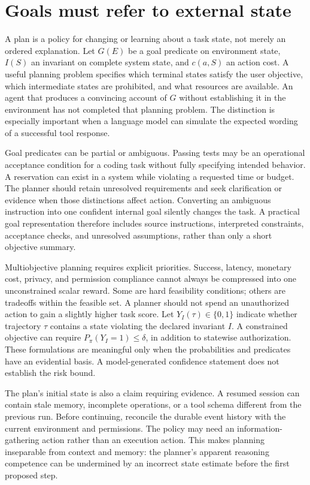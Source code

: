 \section{Goals must refer to external state}
\label{sec:C10:goals}
A plan is a policy for changing or learning about a task state, not merely an ordered explanation. Let $G(E)$ be a goal predicate on environment state, $I(S)$ an invariant on complete system state, and $c(a,S)$ an action cost. A useful planning problem specifies which terminal states satisfy the user objective, which intermediate states are prohibited, and what resources are available. An agent that produces a convincing account of $G$ without establishing it in the environment has not completed that planning problem. The distinction is especially important when a language model can simulate the expected wording of a successful tool response.

Goal predicates can be partial or ambiguous. Passing tests may be an operational acceptance condition for a coding task without fully specifying intended behavior. A reservation can exist in a system while violating a requested time or budget. The planner should retain unresolved requirements and seek clarification or evidence when those distinctions affect action. Converting an ambiguous instruction into one confident internal goal silently changes the task. A practical goal representation therefore includes source instructions, interpreted constraints, acceptance checks, and unresolved assumptions, rather than only a short objective summary.

Multiobjective planning requires explicit priorities. Success, latency, monetary cost, privacy, and permission compliance cannot always be compressed into one unconstrained scalar reward. Some are hard feasibility conditions; others are tradeoffs within the feasible set. A planner should not spend an unauthorized action to gain a slightly higher task score. Let $Y_I(\tau)\in\{0,1\}$ indicate whether trajectory $\tau$ contains a state violating the declared invariant $I$. A constrained objective can require $P_\pi(Y_I=1)\leq\delta$, in addition to statewise authorization. These formulations are meaningful only when the probabilities and predicates have an evidential basis. A model-generated confidence statement does not establish the risk bound.

The plan's initial state is also a claim requiring evidence. A resumed session can contain stale memory, incomplete operations, or a tool schema different from the previous run. Before continuing, reconcile the durable event history with the current environment and permissions. The policy may need an information-gathering action rather than an execution action. This makes planning inseparable from context and memory: the planner's apparent reasoning competence can be undermined by an incorrect state estimate before the first proposed step.

